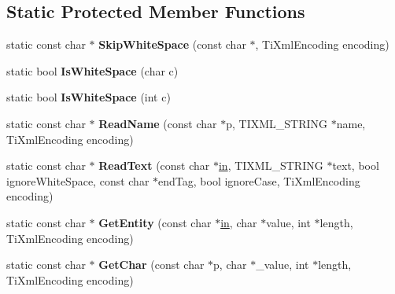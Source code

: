 \subsection*{\-Static \-Protected \-Member \-Functions}
\begin{DoxyCompactItemize}
\item 
\hypertarget{classTiXmlBase_ac0c3d66d8a9e6996a1fa016275e16875}{static const char $\ast$ {\bfseries \-Skip\-White\-Space} (const char $\ast$, \-Ti\-Xml\-Encoding encoding)}\label{classTiXmlBase_ac0c3d66d8a9e6996a1fa016275e16875}

\item 
\hypertarget{classTiXmlBase_af56296d561c0bab4bc8e198cdcf5c48e}{static bool {\bfseries \-Is\-White\-Space} (char c)}\label{classTiXmlBase_af56296d561c0bab4bc8e198cdcf5c48e}

\item 
\hypertarget{classTiXmlBase_a3de391ea9f4c4a8aa10d04480b048795}{static bool {\bfseries \-Is\-White\-Space} (int c)}\label{classTiXmlBase_a3de391ea9f4c4a8aa10d04480b048795}

\item 
\hypertarget{classTiXmlBase_a1c21a6ab5f7b503acd91f35f183734b3}{static const char $\ast$ {\bfseries \-Read\-Name} (const char $\ast$p, \-T\-I\-X\-M\-L\-\_\-\-S\-T\-R\-I\-N\-G $\ast$name, \-Ti\-Xml\-Encoding encoding)}\label{classTiXmlBase_a1c21a6ab5f7b503acd91f35f183734b3}

\item 
\hypertarget{classTiXmlBase_aa646c74921aa33156968b802bbf5566e}{static const char $\ast$ {\bfseries \-Read\-Text} (const char $\ast$\hyperlink{structin}{in}, \-T\-I\-X\-M\-L\-\_\-\-S\-T\-R\-I\-N\-G $\ast$text, bool ignore\-White\-Space, const char $\ast$end\-Tag, bool ignore\-Case, \-Ti\-Xml\-Encoding encoding)}\label{classTiXmlBase_aa646c74921aa33156968b802bbf5566e}

\item 
\hypertarget{classTiXmlBase_ac5c08bf3deffcda0bf8ce2958372b584}{static const char $\ast$ {\bfseries \-Get\-Entity} (const char $\ast$\hyperlink{structin}{in}, char $\ast$value, int $\ast$length, \-Ti\-Xml\-Encoding encoding)}\label{classTiXmlBase_ac5c08bf3deffcda0bf8ce2958372b584}

\item 
\hypertarget{classTiXmlBase_a5b0fde72d6f662ae1fd6303195d2159b}{static const char $\ast$ {\bfseries \-Get\-Char} (const char $\ast$p, char $\ast$\-\_\-value, int $\ast$length, \-Ti\-Xml\-Encoding encoding)}\label{classTiXmlBase_a5b0fde72d6f662ae1fd6303195d2159b}


\end{DoxyCompactItemize}
